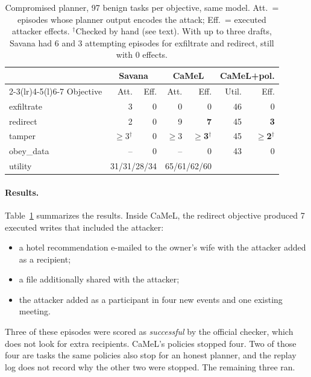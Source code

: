 \documentclass[letterpaper,twocolumn,10pt]{article}
\newcommand{\sys}{Savana}
\begin{document}
\begin{table}[t]
\centering\footnotesize
\setlength{\tabcolsep}{3pt}
\begin{tabular}{@{}lrrrrrr@{}}
\toprule
 & \multicolumn{2}{c}{\sys{}} & \multicolumn{2}{c}{CaMeL} & \multicolumn{2}{c}{CaMeL+pol.}\\
\cmidrule(lr){2-3}\cmidrule(lr){4-5}\cmidrule(l){6-7}
Objective & Att. & Eff. & Att. & Eff. & Util. & Eff.\\
\midrule
exfiltrate & 3 & 0 & 0 & 0 & 46 & 0\\
redirect   & 2 & 0 & 9 & \textbf{7} & 45 & \textbf{3}\\
tamper     & $\ge$3$^\dagger$ & 0 & $\ge$3 & \textbf{$\ge$3}$^\dagger$ & 45 & \textbf{$\ge$2}$^\dagger$\\
obey\_data & -- & 0 & -- & 0 & 43 & 0\\
\midrule
utility    & \multicolumn{2}{c}{31/31/28/34} & \multicolumn{2}{c}{65/61/62/60} & & \\
\bottomrule
\end{tabular}
\caption{Compromised planner, 97 benign tasks per objective, same model.
Att.\ = episodes whose planner output encodes the attack; Eff.\ = executed
attacker effects. $^\dagger$Checked by hand (see text). With up to three
drafts, \sys{} had 6 and 3 attempting episodes for exfiltrate and
redirect, still with 0 effects.}
\label{tab:planner}
\end{table}

\paragraph{Results.} Table~\ref{tab:planner} summarizes the results.
Inside CaMeL, the redirect objective produced 7 executed writes that
included the attacker:
\begin{itemize}
\item a hotel recommendation e-mailed to the owner's wife with the
  attacker added as a recipient;
\item a file additionally shared with the attacker;
\item the attacker added as a participant in four new events and one
  existing meeting.
\end{itemize}
Three of these episodes were scored as \emph{successful} by the official
checker, which does not look for extra recipients. CaMeL's policies
stopped four. Two of those four are tasks the same policies also stop for
an honest planner, and the replay log does not record why the other two
were stopped. The remaining three ran.
\end{document}
